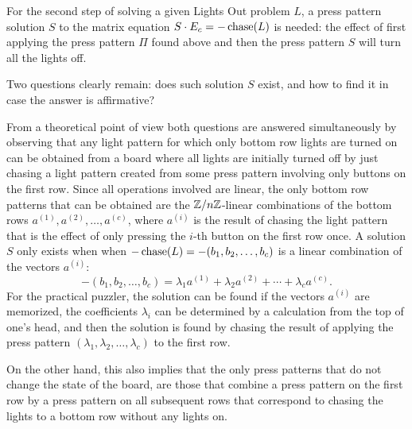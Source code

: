 For the second step of solving a given Lights Out problem
$L$, a press pattern solution $S$ to the matrix
equation $S\cdot E_c=-\operatorname{chase}(L)$ is needed:
the effect of first applying the press pattern
$\Pi$ found above and then the press pattern $S$ will turn all the lights off.

Two questions clearly remain: does such solution $S$ exist, and how
to find it in case the answer is affirmative?

From a theoretical point of view
both questions are answered simultaneously by observing that
any light pattern for which only bottom row lights are turned on
can be obtained from a board where all lights are initially turned off
by just chasing a light pattern created from some
press pattern involving only buttons on the first row.
Since all operations involved are linear, the only bottom row patterns
that can be obtained are the $\mathbb{Z}/n\mathbb{Z}$-linear combinations of the
bottom rows $a^{(1)}, a^{(2)}, \ldots, a^{(c)}$, where $a^{(i)}$ is the result of
chasing the light pattern that is the effect of only pressing the $i$-th
button on the first row once. A solution $S$ only exists when
when $-\operatorname{chase}(L)=-(b_1, b_2, \ldots, b_c)$ is a linear combination
of the vectors $a^{(i)}$:
$$-(b_1, b_2, \ldots, b_c)=\lambda_1a^{(1)}+\lambda_2a^{(2)}+\cdots+\lambda_ca^{(c)}.$$
For the practical puzzler, the solution can be found if the vectors $a^{(i)}$
are memorized, the coefficients $\lambda_i$ can be determined by a calculation
from the top of one's head, and then the solution is found
by chasing the result of applying the press pattern 
$(\lambda_1, \lambda_2, \ldots, \lambda_c)$ to the first row.


On the other hand, this also implies that the only press patterns
that do not change the state of the board, are those that combine
a press pattern on the first row by a press pattern on all subsequent
rows that correspond to chasing the lights to a bottom row without any
lights on.

